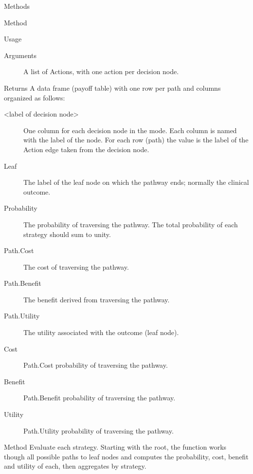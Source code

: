 \documentclass[a4paper]{book}
\begin{document}
\begin{Section}{Methods}
\begin{SubSection}{Method }
\begin{SubSubSection}{Usage}
\end{SubSubSection}


%
\begin{SubSubSection}{Arguments}

\begin{description}

\item[] A list of Actions, with one action per decision node.

\end{description}


\end{SubSubSection}

%
\begin{SubSubSection}{Returns}
A data frame (payoff table) with one row per path and columns
organized as follows:
\begin{description}

\item[<label of decision node>] One column for each decision node
in the mode. Each column is named with the label of the node. For each
row (path) the value is the label of the Action edge taken from the
decision node.
\item[Leaf] The label of the leaf node on which the pathway ends; 
normally the clinical outcome.
\item[Probability] The probability of traversing the pathway. The total
probability of each strategy should sum to unity.
\item[Path.Cost] The cost of traversing the pathway.
\item[Path.Benefit] The benefit derived from traversing the pathway.
\item[Path.Utility] The utility associated with the outcome (leaf node).
\item[Cost] Path.Cost \eqn{*}{} probability of traversing the pathway.
\item[Benefit] Path.Benefit \eqn{*}{} probability of traversing the pathway.
\item[Utility] Path.Utility \eqn{*}{} probability of traversing the pathway.

\end{description}

\end{SubSubSection}

\end{SubSection}



\hypertarget{method-evaluate}{}
%
\begin{SubSection}{Method }
Evaluate each strategy. Starting with the root, the function
works though all possible paths to leaf nodes and computes the probability,
cost, benefit and utility of each, then aggregates by strategy.
%
\end{SubSection}
\end{Section}
\end{document}
